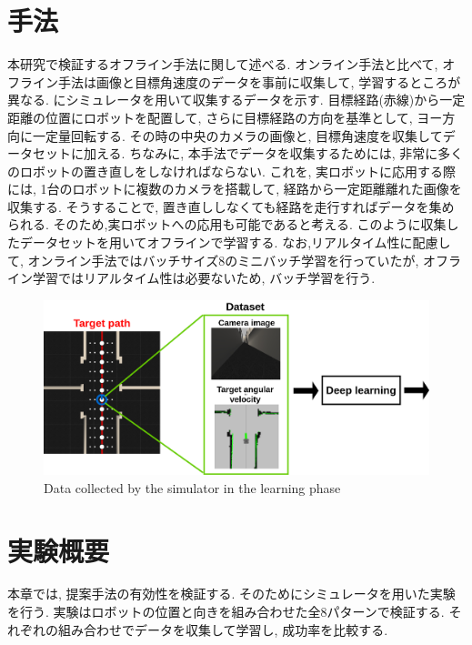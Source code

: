 
\section{手法}
本研究で検証するオフライン手法に関して述べる. オンライン手法と比べて, オフライン手法は画像と目標角速度のデータを事前に収集して, 学習するところが異なる. にシミュレータを用いて収集するデータを示す. 目標経路(赤線)から一定距離の位置にロボットを配置して, さらに目標経路の方向を基準として, ヨー方向に一定量回転する. その時の中央のカメラの画像と, 目標角速度を収集してデータセットに加える. ちなみに, 本手法でデータを収集するためには, 非常に多くのロボットの置き直しをしなければならない. これを, 実ロボットに応用する際には, 1台のロボットに複数のカメラを搭載して, 経路から一定距離離れた画像を収集する. そうすることで, 置き直ししなくても経路を走行すればデータを集められる. そのため,実ロボットへの応用も可能であると考える. このように収集したデータセットを用いてオフラインで学習する. なお,リアルタイム性に配慮して, オンライン手法ではバッチサイズ8のミニバッチ学習を行っていたが, オフライン学習ではリアルタイム性は必要ないため, バッチ学習を行う. 

\newpage
  \begin{figure}[h]
  \centering
  \includegraphics[keepaspectratio, scale=0.2]{images/collect-data2.png}
  \caption{Data collected by the simulator in the learning phase}
  \label{Fig:collect-data2}
  \end{figure}

\section{実験概要}
本章では, 提案手法の有効性を検証する. そのためにシミュレータを用いた実験を行う. 実験はロボットの位置と向きを組み合わせた全8パターンで検証する. それぞれの組み合わせでデータを収集して学習し, 成功率を比較する. 

